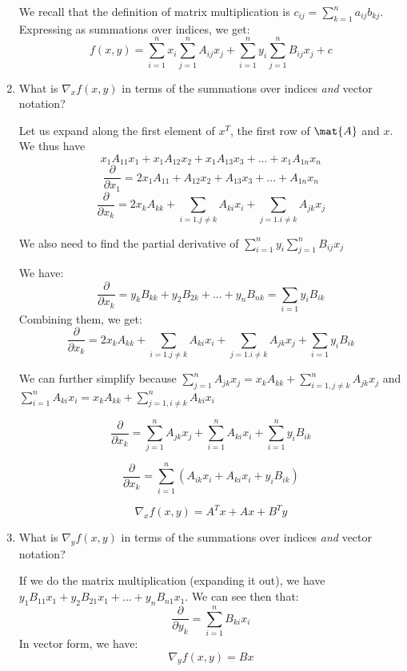\documentclass{article}
\begin{document}
\begin{aprob}
\begin{enumerate}
        We recall that the definition of matrix multiplication is $c_{ij} = \sum_{k=1}^{n} a_{ij}b_{kj}$. Expressing as summations over indices, we get:
        $$f(x,y) = \sum_{i=1}^{n} x_{i} \sum_{j=1}^{n} A_{ij}x_{j} + \sum_{i=1}^{n} y_{i} \sum_{j=1}^{n} B_{ij}x_{j} + c$$
        
    	\item {} What is $\nabla_x f(x,y)$ in terms of the summations over indices \emph{and} vector notation?
    	
    	Let us expand along the first element of $x^T$, the first row of $\mat{A}$ and $x$. We thus have
$$x_{1}A_{11}x_{1}+x_{1}A_{12}x_{2}+x_{1}A_{13}x_{3}+...+x_{1}A_{1n}x_{n}$$
    	$$\frac{\partial}{\partial x_1} = 2x_{1}A_{11} + A_{12}x_{2} + A_{13}x_{3}+...+A_{1n}x_{n}$$
    	$$\frac{\partial}{\partial x_k} = 2x_{k}A_{kk} + \sum_{i=1. j\neq k} A_{ki}x_{i} + \sum_{j=1. i\neq k} A_{jk}x_{j}$$
    	
    	We also need to find the partial derivative of $\sum_{i=1}^{n} y_{i} \sum_{j=1}^{n} B_{ij}x_{j} $
    	
    	We have:
    	$$\frac{\partial}{\partial x_k} = y_{k}B_{kk}+y_{2}B_{2k}+...+y_{n}B_{nk} = \sum_{i=1} y_{i}B_{ik}$$
    	Combining them, we get:
    		$$\frac{\partial}{\partial x_k} = 2x_{k}A_{kk} + \sum_{i=1. j\neq k} A_{ki}x_{i} + \sum_{j=1. i\neq k} A_{jk}x_{j} + \sum_{i=1} y_{i}B_{ik}$$
    		
    		We can further simplify because $ \sum_{j=1}^{n} A_{jk}x_{j}=x_{k}A_{kk}+ \sum_{i=1, j \neq k}^{n}A_{jk}x_{j}$
    	and $ \sum_{i=1}^{n} A_{ki}x_{i}=x_{k}A_{kk}+ \sum_{j=1, i \neq k}^{n}A_{ki}x_{i}$
    	
    	$$\frac{\partial}{\partial x_k} = \sum_{j=1}^{n} A_{jk}x_{j} + \sum_{i=1}^{n} A_{ki}x_{i} + \sum_{i=1}^{n} y_{i}B_{ik}$$
    	
    	$$\frac{\partial}{\partial x_k} = \sum_{i=1}^{n} \left( A_{ik}x_{i} + A_{ki}x_{i} + y_{i}B_{ik} \right)$$
    	
    	$$ \nabla_x f(x,y) = A^{T}x + Ax + B^{T}y$$
    	
    	\item {} What is $\nabla_y f(x,y)$ in terms of the summations over indices \emph{and} vector notation?
    	
    	If we do the matrix multiplication (expanding it out), we have $y_{1}B_{11}x_{1} + y_{2}B_{21}x_{1} + ... + y_{n}B_{n1}x_{1}$.
    	We can see then that: 
    	$$\frac{\partial}{\partial y_k} = \sum_{i=1}^{n} B_{ki}x_{i}$$
    	In vector form, we have:
    	$$ \nabla_y f(x,y) = Bx$$
    \end{enumerate}

\end{aprob}
\end{document}
